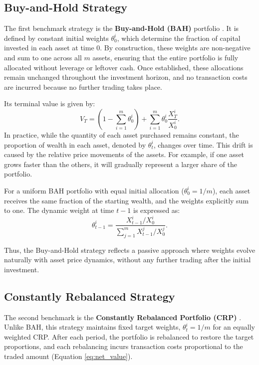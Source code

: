 \documentclass[12pt,a4paper]{report}
\begin{document}
\subsection{Buy-and-Hold Strategy}
\label{subsec:bah}

The first benchmark strategy is the \textbf{Buy-and-Hold (BAH)} portfolio \citep{Siegel1998, Bogle1999}. It is defined by constant initial weights \( \theta^i_0 \), which determine the fraction of capital invested in each asset at time \(0\). By construction, these weights are non-negative and sum to one across all \( m \) assets, ensuring that the entire portfolio is fully allocated without leverage or leftover cash. Once established, these allocations remain unchanged throughout the investment horizon, and no transaction costs are incurred because no further trading takes place.

Its terminal value is given by:
\begin{equation}
V_T = \left(1 - \sum_{i=1}^m \theta^i_0 \right) + \sum_{i=1}^m \theta^i_0 \frac{X^i_T}{X^i_0}.
\label{eq:bah_value}
\end{equation}
In practice, while the quantity of each asset purchased remains constant, the proportion of wealth in each asset, denoted by \( \theta^i_t \), changes over time. This drift is caused by the relative price movements of the assets. For example, if one asset grows faster than the others, it will gradually represent a larger share of the portfolio. 

For a uniform BAH portfolio with equal initial allocation (\( \theta^i_0 = 1/m \)), each asset receives the same fraction of the starting wealth, and the weights explicitly sum to one. The dynamic weight at time \( t-1 \) is expressed as:
\begin{equation}
\theta^i_{t-1} = \frac{ X^i_{t-1} / X^i_0 }{ \sum_{j=1}^m X^j_{t-1} / X^j_0 }.
\label{eq:bah_dynamic_weight}
\end{equation}

Thus, the Buy-and-Hold strategy reflects a passive approach where weights evolve naturally with asset price dynamics, without any further trading after the initial investment.

\subsection{Constantly Rebalanced Strategy}
\label{subsec:crp}
The second benchmark is the \textbf{Constantly Rebalanced Portfolio (CRP)} \citep{Cover1991}. Unlike BAH, this strategy maintains fixed target weights, \( \theta^i_t = 1/m \) for an equally weighted CRP. After each period, the portfolio is rebalanced to restore the target proportions, and each rebalancing incurs transaction costs proportional to the traded amount (Equation \ref{eq:net_value}).
\end{document}
